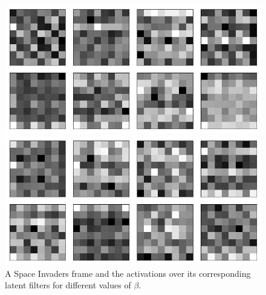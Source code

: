 \begin{figure}[h!]
\begin{minipage}{0.55\textwidth}
\caption{$\beta = 1$}
\includegraphics[scale=0.42]{figures/results/colour_separated/beta_2_convolutional_layers_sample_3.png}
\caption{$\beta = 2$}
\includegraphics[scale=0.42]{figures/results/colour_separated/beta_4_convolutional_layers_sample_3.png}
\caption{$\beta = 4$}
\end{minipage}
\caption{A Space Invaders frame and the activations over its corresponding latent filters for different values of $\beta$.}
\label{fig:colour_separated_originals_and_latent_filters}
\end{figure}






